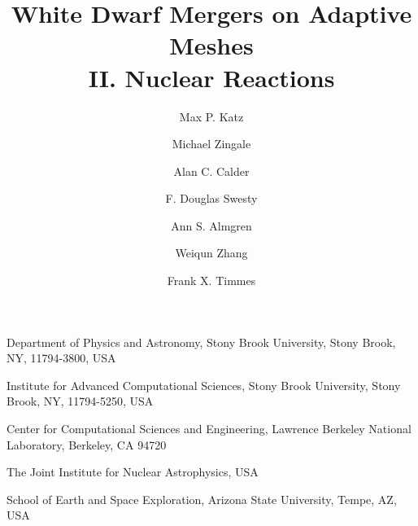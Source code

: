 \documentclass[twocolumn,numberedappendix]{../aastex6}
\begin{document}
\title{White Dwarf Mergers on Adaptive Meshes\\ II. Nuclear Reactions}


\author{Max P. Katz}
\author{Michael Zingale}
\author{Alan C. Calder}
\author{F. Douglas Swesty}
\author{Ann S. Almgren}
\author{Weiqun Zhang}
\author{Frank X. Timmes}

{
  Department of Physics and Astronomy,
  Stony Brook University, Stony Brook, NY, 11794-3800, USA
}

{
  Institute for Advanced Computational Sciences,
  Stony Brook University, Stony Brook, NY, 11794-5250, USA
}

{
  Center for Computational Sciences and Engineering,
  Lawrence Berkeley National Laboratory, Berkeley, CA 94720
}

{
  The Joint Institute for Nuclear Astrophysics, USA
}

{
  School of Earth and Space Exploration, Arizona State University, Tempe, AZ, USA
}
\end{document}
